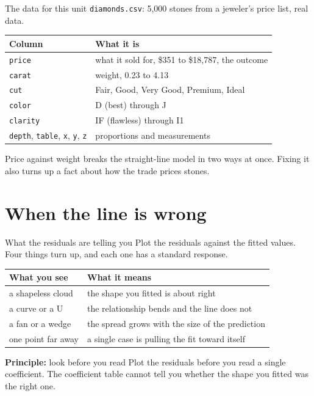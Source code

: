 \documentclass[aspectratio=169]{beamer}
\newenvironment{principle}[1]{\begin{block}{\textbf{Principle:} #1}}{\end{block}}
\begin{document}
\begin{frame}{The data for this unit}
\texttt{diamonds.csv}: 5,000 stones from a jeweler's price list, real data.
\begin{center}\small
\begin{tabular}{L{0.22\textwidth} L{0.66\textwidth}}
\toprule
\textbf{Column} & \textbf{What it is} \\
\midrule
\texttt{price} & what it sold for, \$351 to \$18,787, the outcome \\
\texttt{carat} & weight, 0.23 to 4.13 \\
\texttt{cut} & Fair, Good, Very Good, Premium, Ideal \\
\texttt{color} & D (best) through J \\
\texttt{clarity} & IF (flawless) through I1 \\
\texttt{depth}, \texttt{table}, \texttt{x}, \texttt{y}, \texttt{z} & proportions and measurements \\
\bottomrule
\end{tabular}
\end{center}
\vspace{0.3em}
Price against weight breaks the straight-line model in two ways at once. Fixing it also turns
up a fact about how the trade prices stones.
\end{frame}

\section{When the line is wrong}
\begin{frame}{What the residuals are telling you}
Plot the residuals against the fitted values. Four things turn up, and each one has a standard
response.
\begin{center}\small
\begin{tabular}{L{0.26\textwidth} L{0.62\textwidth}}
\toprule
\textbf{What you see} & \textbf{What it means} \\
\midrule
a shapeless cloud & the shape you fitted is about right \\
a curve or a U & the relationship bends and the line does not \\
a fan or a wedge & the spread grows with the size of the prediction \\
one point far away & a single case is pulling the fit toward itself \\
\bottomrule
\end{tabular}
\end{center}
\vspace{0.2em}
\begin{principle}{look before you read}
Plot the residuals before you read a single coefficient. The coefficient table cannot tell you
whether the shape you fitted was the right one.
\end{principle}
\end{frame}
\end{document}
